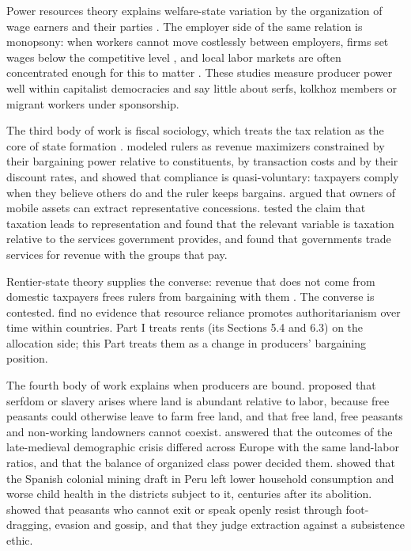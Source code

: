 \documentclass[11pt,letterpaper]{article}
\theoremstyle{definition}
\theoremstyle{remark}
\begin{document}
Power resources theory explains welfare-state variation by the organization of wage earners and their parties \citep{korpi1983,esping1985}. The employer side of the same relation is monopsony: when workers cannot move costlessly between employers, firms set wages below the competitive level \citep{manning2003}, and local labor markets are often concentrated enough for this to matter \citep{azar2022}. These studies measure producer power well within capitalist democracies and say little about serfs, kolkhoz members or migrant workers under sponsorship.

The third body of work is fiscal sociology, which treats the tax relation as the core of state formation \citep{campbell1993,martin2009}. \citet{levi1988} modeled rulers as revenue maximizers constrained by their bargaining power relative to constituents, by transaction costs and by their discount rates, and showed that compliance is quasi-voluntary: taxpayers comply when they believe others do and the ruler keeps bargains. \citet{bates1985} argued that owners of mobile assets can extract representative concessions. \citet{ross2004} tested the claim that taxation leads to representation and found that the relevant variable is taxation relative to the services government provides, and \citet{timmons2005} found that governments trade services for revenue with the groups that pay.

Rentier-state theory supplies the converse: revenue that does not come from domestic taxpayers frees rulers from bargaining with them \citep{mahdavy1970,beblawiluciani1987,ross2001}. The converse is contested. \citet{habermenaldo2011} find no evidence that resource reliance promotes authoritarianism over time within countries. Part I \citep{long2026financial} treats rents (its Sections 5.4 and 6.3) on the allocation side; this Part treats them as a change in producers' bargaining position.

The fourth body of work explains when producers are bound. \citet{domar1970} proposed that serfdom or slavery arises where land is abundant relative to labor, because free peasants could otherwise leave to farm free land, and that free land, free peasants and non-working landowners cannot coexist. \citet{brenner1976} answered that the outcomes of the late-medieval demographic crisis differed across Europe with the same land-labor ratios, and that the balance of organized class power decided them. \citet{dell2010} showed that the Spanish colonial mining draft in Peru left lower household consumption and worse child health in the districts subject to it, centuries after its abolition. \citet{scott1976,scott1985} showed that peasants who cannot exit or speak openly resist through foot-dragging, evasion and gossip, and that they judge extraction against a subsistence ethic.
\end{document}
